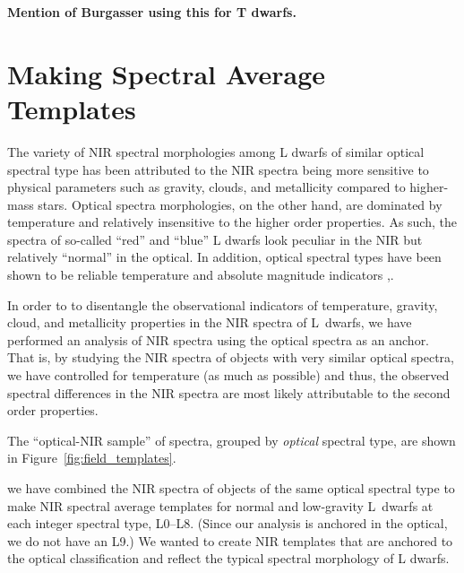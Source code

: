 \documentclass[12pt,preprint]{aastex}
\newcommand{\sample}{180}
\begin{document}
\textbf{Mention of Burgasser using this for T dwarfs.}

\section{Making Spectral Average Templates}
\label{sec:templates}

The variety of NIR spectral morphologies among L dwarfs of similar optical spectral type has been attributed to the NIR spectra being more sensitive to physical parameters such as gravity, clouds, and metallicity compared to higher-mass stars.
Optical spectra morphologies, on the other hand, are dominated by temperature and relatively insensitive to the higher order properties. As such, the spectra of so-called ``red'' and ``blue'' L dwarfs look peculiar in the NIR but relatively ``normal'' in the optical. 
In addition, optical spectral types have been shown to be reliable temperature and absolute magnitude indicators \cite[Figure 7 and 9]{Kirkpatrick05},\cite{Faherty:2012cy}. 

In order to to disentangle the observational indicators of temperature, gravity, cloud, and metallicity properties in the NIR spectra of L~dwarfs, we have performed an analysis of NIR spectra using the optical spectra as an anchor.
That is, by studying the NIR spectra of objects with very similar optical spectra, we have controlled for temperature (as much as possible) and thus, the observed spectral differences in the NIR spectra are most likely attributable to the second order properties.

The ``optical-NIR sample'' of spectra, grouped by \emph{optical} spectral type, are shown in Figure~\ref{fig:field_templates}. 

 we have combined the NIR spectra of objects of the same optical spectral type to make NIR spectral average templates for normal and low-gravity L~dwarfs at each integer spectral type, L0--L8. (Since our analysis is anchored in the optical, we do not have an L9.) 
We wanted to create NIR templates that are anchored to the optical classification and reflect the typical spectral morphology of L dwarfs. 
\end{document}
